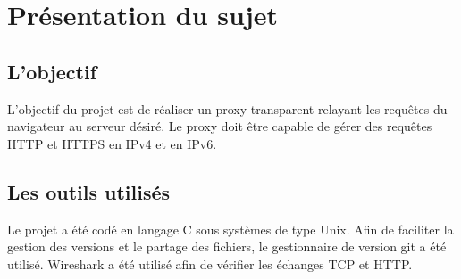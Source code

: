 \section{Présentation du sujet} %

\subsection{L'objectif}

L'objectif du projet est de réaliser un proxy transparent relayant les requêtes du navigateur au serveur désiré. 
Le proxy doit être capable de gérer des requêtes HTTP et HTTPS en IPv4 et en IPv6.

\subsection{Les outils utilisés}

Le projet a été codé en langage C sous systèmes de type Unix. Afin de faciliter la gestion des versions et le partage des fichiers, le gestionnaire de version git a été utilisé. \linebreak
Wireshark a été utilisé afin de vérifier les échanges TCP et HTTP.
